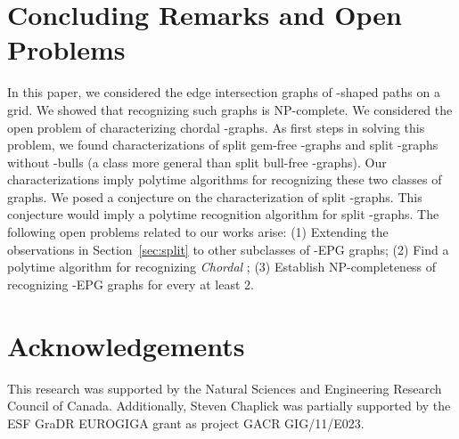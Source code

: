 \documentclass[11pt,3p,times]{elsarticle}
\begin{document}
\section{Concluding Remarks and Open Problems}\label{sec:conclusion}
In this paper, we considered the edge intersection graphs of
-shaped paths on a grid. We showed that recognizing such
graphs is NP-complete. We considered the open problem of
characterizing chordal -graphs. As first steps in solving
this problem, we found characterizations of split gem-free
-graphs and split -graphs without -bulls (a class
more general than split bull-free -graphs). Our
characterizations imply polytime algorithms for recognizing these
two classes of graphs. We posed a conjecture on the
characterization of split -graphs. This conjecture would
imply a polytime recognition algorithm for split -graphs. The
following open problems related to our works arise: (1) Extending
the observations in Section~\ref{sec:split} to other subclasses of
-EPG graphs; (2) Find a polytime algorithm for recognizing {\em Chordal}
; (3) Establish NP-completeness of recognizing
-EPG graphs for every  at least 2.

\section{Acknowledgements}
This research was supported by the Natural Sciences and Engineering Research Council of Canada. 
Additionally, Steven Chaplick was partially supported by the ESF GraDR EUROGIGA grant as project GACR GIG/11/E023.






\end{document}
